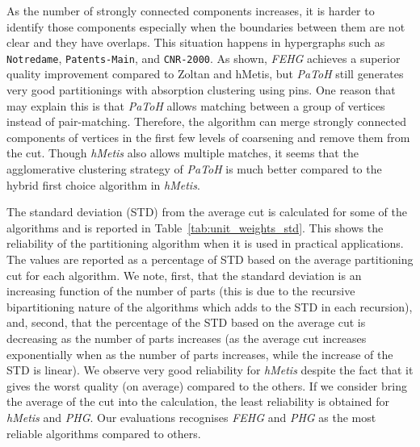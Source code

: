 \documentclass[twocolumn]{svjour3}          \smartqed
\begin{document}
As the number of strongly connected components increases, it is harder to identify those components especially when the boundaries between them are not clear and they have overlaps. This situation happens in hypergraphs such as \texttt{Notredame}, \texttt{Patents-Main}, and \texttt{CNR-2000}. As shown, \textit{FEHG} achieves a superior quality improvement compared to Zoltan and hMetis, but \textit{PaToH} still generates very good partitionings with absorption clustering using pins. One reason that may explain this is that \textit{PaToH} allows matching between a group of vertices instead of pair-matching. Therefore, the algorithm can merge strongly connected components of vertices in the first few levels of coarsening and remove them from the cut. Though \textit{hMetis} also allows multiple matches, it seems that the agglomerative clustering strategy of \textit{PaToH} is much better compared to the hybrid first choice algorithm in \textit{hMetis}. 

The standard deviation (STD) from the average cut is calculated for some of the algorithms and is reported in Table~\ref{tab:unit_weights_std}. This shows the reliability of the partitioning algorithm when it is used in practical applications. The values are reported as a percentage of STD based on the average partitioning cut for each algorithm. We note, first, that the standard deviation is an increasing function of the number of parts (this is due to the recursive bipartitioning nature of the algorithms which adds to the STD in each recursion), and, second, that the percentage of the STD based on the average cut is decreasing as the number of parts increases (as the average cut increases exponentially when as the number of parts increases, while the increase of the STD is linear). We observe very good reliability for \textit{hMetis} despite the fact that it gives the worst quality (on average) compared to the others. If we consider bring the average of the cut into the calculation, the least reliability is obtained for \textit{hMetis} and \textit{PHG}. Our evaluations recognises \textit{FEHG} and \textit{PHG} as the most reliable algorithms compared to others. 
\end{document}
